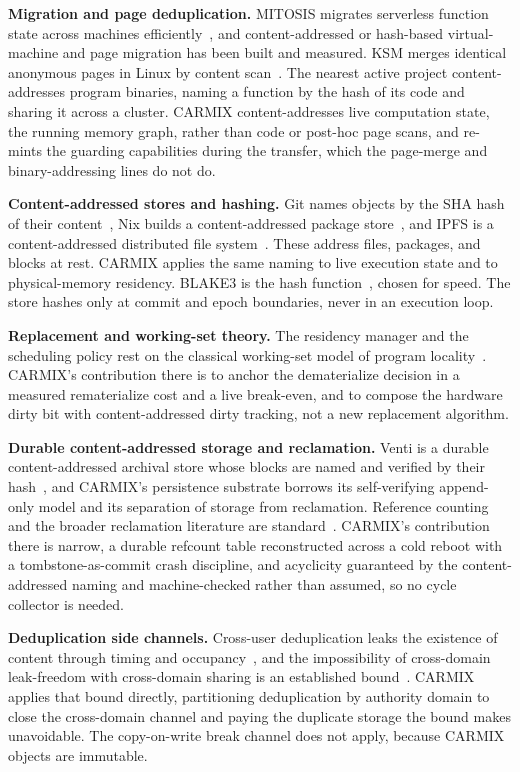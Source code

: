 \documentclass[10pt,twocolumn]{article}
\newcommand{\carmix}{CARMIX}
\begin{document}
\textbf{Migration and page deduplication.} MITOSIS migrates serverless function
state across machines efficiently~\cite{du2023mitosis}, and content-addressed or
hash-based virtual-machine and page migration has been built and measured. KSM
merges identical anonymous pages in Linux by content
scan~\cite{arcangeli2009ksm}. The nearest active project content-addresses program
binaries, naming a function by the hash of its code and sharing it across a
cluster. \carmix{} content-addresses live computation state, the running memory
graph, rather than code or post-hoc page scans, and re-mints the guarding
capabilities during the transfer, which the page-merge and binary-addressing lines
do not do.

\textbf{Content-addressed stores and hashing.} Git names objects by the SHA hash
of their content~\cite{git}, Nix builds a content-addressed package
store~\cite{dolstra2004nix}, and IPFS is a content-addressed distributed file
system~\cite{benet2014ipfs}. These address files, packages, and blocks at rest.
\carmix{} applies the same naming to live execution state and to physical-memory
residency. BLAKE3 is the hash function~\cite{blake3}, chosen for speed. The store
hashes only at commit and epoch boundaries, never in an execution loop.

\textbf{Replacement and working-set theory.} The residency manager and the
scheduling policy rest on the classical working-set model of program
locality~\cite{denning1968workingset}. \carmix{}'s contribution there is to anchor
the dematerialize decision in a measured rematerialize cost and a live break-even,
and to compose the hardware dirty bit with content-addressed dirty tracking, not a
new replacement algorithm.

\textbf{Durable content-addressed storage and reclamation.} Venti is a durable
content-addressed archival store whose blocks are named and verified by their
hash~\cite{quinlan2002venti}, and \carmix{}'s persistence substrate borrows its
self-verifying append-only model and its separation of storage from reclamation.
Reference counting and the broader reclamation literature are
standard~\cite{jones2011gchandbook}. \carmix{}'s contribution there is narrow, a
durable refcount table reconstructed across a cold reboot with a
tombstone-as-commit crash discipline, and acyclicity guaranteed by the
content-addressed naming and machine-checked rather than assumed, so no cycle
collector is needed.

\textbf{Deduplication side channels.} Cross-user deduplication leaks the existence
of content through timing and occupancy~\cite{harnik2010sidechannels}, and the
impossibility of cross-domain leak-freedom with cross-domain sharing is an
established bound~\cite{armknecht2015dedup}. \carmix{} applies that bound directly,
partitioning deduplication by authority domain to close the cross-domain channel
and paying the duplicate storage the bound makes unavoidable. The copy-on-write
break channel does not apply, because \carmix{} objects are immutable.
\end{document}
